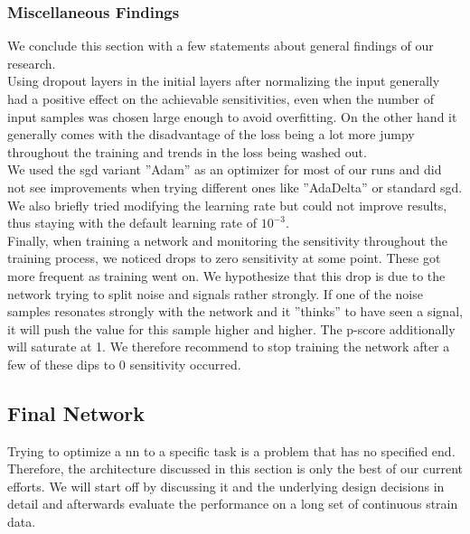 \subsubsection{Miscellaneous Findings}
We conclude this section with a few statements about general findings of our research.\\
Using dropout layers in the initial layers after normalizing the input generally had a positive effect on the achievable sensitivities, even when the number of input samples was chosen large enough to avoid overfitting. On the other hand it generally comes with the disadvantage of the loss being a lot more jumpy throughout the training and trends in the loss being washed out.\\
We used the \gls{sgd} variant ''Adam'' as an optimizer for most of our runs and did not see improvements when trying different ones like ''AdaDelta'' or standard \gls{sgd}. We also briefly tried modifying the learning rate but could not improve results, thus staying with the default learning rate of $10^{-3}$.\\
Finally, when training a network and monitoring the sensitivity throughout the training process, we noticed drops to zero sensitivity at some point. These got more frequent as training went on. We hypothesize that this drop is due to the network trying to split noise and signals rather strongly. If one of the noise samples resonates strongly with the network and it ''thinks'' to have seen a signal, it will push the value for this sample higher and higher. The p-score additionally will saturate at 1. We therefore recommend to stop training the network after a few of these dips to 0 sensitivity occurred.


\subsection{Final Network}
Trying to optimize a \gls{nn} to a specific task is a problem that has no specified end. Therefore, the architecture discussed in this section is only the best of our current efforts. We will start off by discussing it and the underlying design decisions in detail and afterwards evaluate the performance on a long set of continuous strain data.
